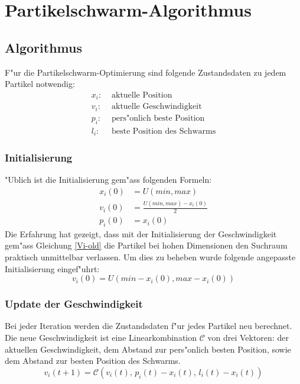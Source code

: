\section{Partikelschwarm-Algorithmus}

\subsection{Algorithmus}
F"ur die Partikelschwarm-Optimierung sind folgende Zustandsdaten zu
jedem Partikel notwendig:
\begin{align*}
	x_i: & \text{ aktuelle Position}\\
	v_i: & \text{ aktuelle Geschwindigkeit}\\
	p_i: & \text{ pers"onlich beste Position} \\
	l_i: & \text{ beste Position des Schwarms}
\end{align*} 

\subsubsection{Initialisierung}
"Ublich ist die Initialisierung gem"ass folgenden Formeln:
\begin{align}
	x_i(0) &= U(min,max) \\
	v_i(0) &= \frac{U(min,max) - x_i(0)}{2} \label{Vi-old} \\ 
	p_i(0) &= x_i(0)
\end{align}
Die Erfahrung hat gezeigt, dass mit der Initialisierung der
Geschwindigkeit gem"ass Gleichung \ref{Vi-old} die Partikel bei hohen
Dimensionen den Suchraum praktisch unmittelbar verlassen. Um dies zu
beheben wurde folgende angepasste Initialisierung eingef"uhrt:
\begin{equation}
	v_i(0) = U(min - x_i(0), max - x_i(0))
\end{equation}

\subsubsection{Update der Geschwindigkeit}
Bei jeder Iteration werden die Zustandsdaten f"ur jedes Partikel
neu berechnet. Die neue Geschwindigkeit ist eine Linearkombination
$\mathcal{C}$ von drei Vektoren: der aktuellen Geschwindigkeit, dem
Abstand zur pers"onlich besten Position, sowie dem Abstand zur besten
Position des Schwarms.
\begin{equation}
	v_{i}(t+1) = \mathcal{C}(v_i(t),\, p_i(t)-x_i(t),\, l_i(t)-x_i(t))
\end{equation}

